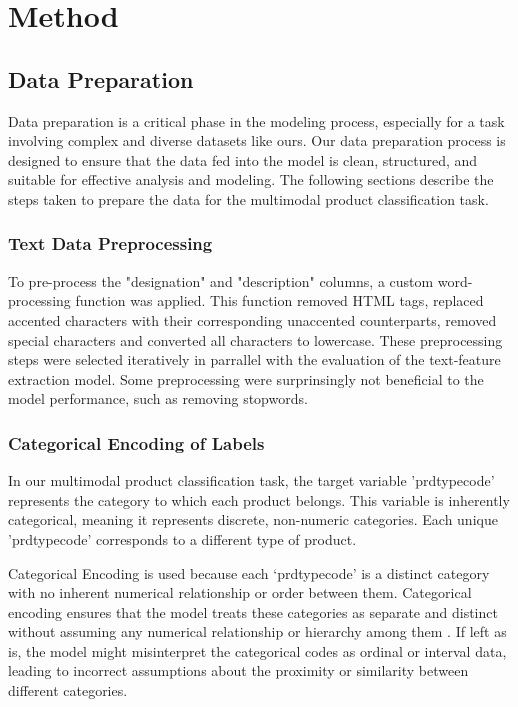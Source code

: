 \chapter{Method}
\label{sec:method}

\section{Data Preparation}
Data preparation is a critical phase in the modeling process, especially for a task involving complex and diverse datasets like ours. Our data preparation process is designed to ensure that the data fed into the model is clean, structured, and suitable for effective analysis and modeling. The following sections describe the steps taken to prepare the data for the multimodal product classification task.

\subsection{Text Data Preprocessing}

To pre-process the "designation" and "description" columns, a custom word-processing function was applied. This function removed HTML tags, replaced accented characters with their corresponding unaccented counterparts, removed special characters and converted all characters to lowercase. These preprocessing steps were selected iteratively in parrallel with the evaluation of the text-feature extraction model. Some preprocessing were surprinsingly not beneficial to the model performance, such as removing stopwords.



\subsection{Categorical Encoding of Labels}

In our multimodal product classification task, the target variable 'prdtypecode' represents the category to which each product belongs. This variable is inherently categorical, meaning it represents discrete, non-numeric categories. Each unique 'prdtypecode' corresponds to a different type of product.

Categorical Encoding is used because each ‘prdtypecode’ is a distinct category with no inherent numerical relationship or order between them. Categorical encoding ensures that the model treats these categories as separate and distinct without assuming any numerical relationship or hierarchy among them \cite{potdar-2017}. If left as is, the model might misinterpret the categorical codes as ordinal or interval  data, leading to incorrect assumptions about the proximity or similarity between different categories.

